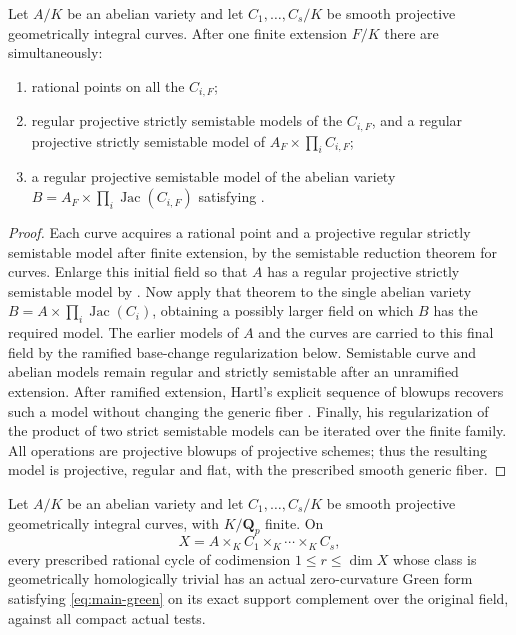 \begin{lemma}
\label{lem:product-model}
Let $A/K$ be an abelian variety and let $C_1,\ldots,C_s/K$
be smooth projective geometrically integral curves.  After
one finite extension $F/K$ there are simultaneously:
\begin{enumerate}
\item rational points on all the $C_{i,F}$;
\item regular projective strictly semistable models of the
  $C_{i,F}$, and a regular projective strictly semistable
  model of $A_F\times\prod_i C_{i,F}$;
\item a regular projective semistable model of the abelian
  variety $B=A_F\times\prod_i\operatorname{Jac}(C_{i,F})$
  satisfying .
\end{enumerate}
\end{lemma}

\begin{proof}
Each curve acquires a rational point and a projective regular
strictly semistable model after finite extension, by the
semistable reduction theorem for curves.  Enlarge this initial
field so that $A$ has a regular projective strictly semistable
model by .  Now apply that theorem to
the single abelian variety
$B=A\times\prod_i\operatorname{Jac}(C_i)$, obtaining a
possibly larger field on which $B$ has the required model.
The earlier models of $A$ and the curves are carried to this
final field by the ramified base-change regularization below.
Semistable
curve and abelian models remain regular and strictly semistable
after an unramified extension.  After ramified extension,
Hartl's explicit sequence of blowups recovers such a model
without changing the generic fiber
\cite[Proposition~2.2]{Hartl}.  Finally, his regularization of
the product of two strict semistable models
\cite[Proposition~2.1]{Hartl} can be iterated over the finite
family.  All operations are projective blowups of projective
schemes; thus the resulting model is projective, regular and
flat, with the prescribed smooth generic fiber.
\end{proof}

\begin{theorem}
\label{thm:curve-products-G}
Let $A/K$ be an abelian variety and let $C_1,\ldots,C_s/K$
be smooth projective geometrically integral curves, with
$K/\mathbf Q_p$ finite.  On
\[
                       X=A\times_K C_1\times_K\cdots\times_K C_s,
\]
every prescribed rational cycle of codimension
$1\le r\le\dim X$ whose class is geometrically homologically
trivial has an actual zero-curvature Green form satisfying
\eqref{eq:main-green} on its exact support complement over the
original field, against all compact actual tests.
\end{theorem}

